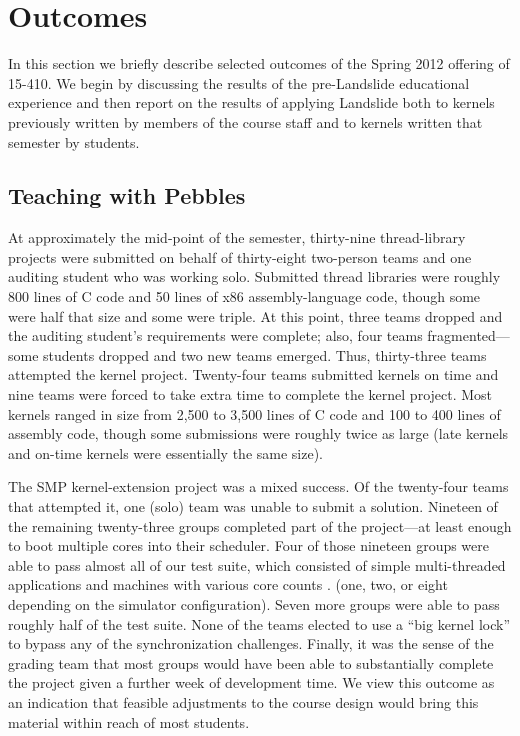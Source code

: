 \section{Outcomes}

In this section we briefly describe selected
outcomes of the Spring 2012 offering of 15-410.
We begin by discussing the results of the
pre-Landslide educational experience and then
report on the results of applying Landslide both to
kernels previously written by members of the course staff
and to kernels written that semester by students.

\subsection{Teaching with Pebbles}

At approximately the mid-point of the semester,
thirty-nine thread-library projects were submitted
on behalf of thirty-eight two-person teams and one
auditing student who was working solo.
%
Submitted thread libraries were roughly 800 lines of C code
and 50 lines of x86 assembly-language code,
though some were half that size and some were triple.
%
At this point, three teams dropped and the auditing
student's requirements were complete;
also, four teams fragmented---some students dropped and
two new teams emerged.
Thus, thirty-three teams attempted the kernel project.
%
Twenty-four teams submitted kernels on time and nine
teams were forced to take extra time to complete the
kernel project.
Most kernels ranged in size from 2,500 to 3,500 lines
of C code and 100 to 400 lines of assembly code,
though some submissions were roughly twice as large
(late kernels and on-time kernels were essentially the
same size).


The SMP kernel-extension project
was a mixed success.
Of the twenty-four teams that attempted it,
one (solo) team was unable to submit a solution.
Nineteen of the remaining twenty-three groups
completed part of the project---at least enough to
boot multiple cores
into their scheduler.
Four of those nineteen groups were able to pass
almost all of our test suite,
which consisted of simple multi-threaded applications
and machines with various core counts\shortversion
{.}
{(one, two, or eight depending on the simulator configuration).}
Seven more groups were able to pass roughly half of the test suite.
None of the teams elected to use a ``big kernel lock'' to bypass any of the synchronization challenges.
Finally, it was the sense of the grading team that
most groups would have been able to substantially complete
the project given a further week of development time.
We view this outcome as an indication that feasible adjustments
to the course design would bring this material within reach
of most students.

